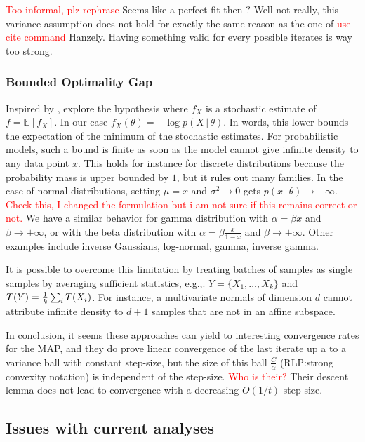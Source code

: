 \documentclass[twoside]{article}
\newcommand{\rlp}[1]{\textcolor{BrickRed}{(RLP:#1)}}
\newcommand*{\expect}[2][]{\ensuremath{\mathbb{E}_{#1} \left[ #2 \right] }} %
\newcommand*{\expecti}[2][]{\ensuremath{\mathbb{E}_{#1} [ #2 ] }} %
\newcommand{\cond}{\,\vert\,}
\newcommand{\nat}{\theta}
\begin{document}
\textcolor{red}{Too informal, plz rephrase} Seems like a perfect fit then ? Well not really, this variance assumption does not hold for exactly the same reason as the one of \textcolor{red}{use cite command} Hanzely. Having something valid for every possible iterates is way too strong.

\subsubsection{Bounded Optimality Gap}
Inspired by \citet{loizou2021stochastic}, \citet{dorazio2021stochastic} explore the hypothesis
\alignn{
\min_\nat f(\nat) - \expect[X]{\min_\nat f_X(\nat)} \leq C,
\label{eq:dorazio}
}
where $f_X$ is a stochastic estimate of $f = \expecti{f_X}$. In our case $f_X(\nat) = - \log p(X\cond \nat)$.
In words, this lower bounds the expectation of the minimum of the stochastic estimates.
For probabilistic models, such a bound is finite as soon as the model cannot give infinite density to any data point $x$.
This holds for instance for discrete distributions because the probability mass is upper bounded by $1$,
but it rules out  many families.
In the case of normal distributions, setting $\mu=x$ and $\sigma^2 \rightarrow 0$ gets $p(x\cond \nat) \rightarrow +\infty$. \textcolor{red}{Check this, I changed the formulation but i am not sure if this remains correct or not.} We have a similar behavior for gamma distribution with $\alpha = \beta x$ and $\beta \rightarrow +\infty$, or with the beta distribution with $\alpha=\beta \frac{x}{1-x}$ and $\beta \rightarrow +\infty$.
 Other examples include inverse Gaussians, log-normal, gamma, inverse gamma.

It is possible to overcome this limitation by treating batches of samples as single samples by averaging sufficient statistics, e.g.,. $Y = \{X_1, \dots, X_k\}$ and $T(Y) = \frac{1}{k}\sum_i T(X_i)$.
For instance, a multivariate normals of dimension $d$ cannot attribute infinite density to $d+1$ samples that are not in an affine subspace.

In conclusion, it seems these approaches can yield to interesting convergence rates for the MAP, and they do prove linear convergence of the last iterate up a to a variance ball with constant step-size, but the size of this ball $\frac{C}{\alpha}$ \rlp{strong convexity notation} is independent of the step-size. \textcolor{red}{Who is their?} Their descent lemma does not lead to convergence with a decreasing $O(1/t)$ step-size.


\subsection{Issues with current analyses}
\end{document}
